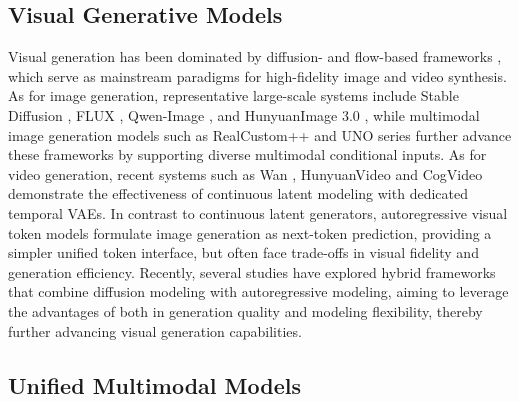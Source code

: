 \subsection{Visual Generative Models}
Visual generation has been dominated by diffusion- and flow-based frameworks \cite{ho2020denoising,esser2024scaling,lipman2024flow,wu2024vmix,huang2024realcustom, mao2024realcustom++,fu2025feededit,fu2026layeredit,mou2025dreamo,blackforestlabs_flux,labs2025flux}, which serve as mainstream paradigms for high-fidelity image and video synthesis.
As for image generation, representative large-scale systems include Stable Diffusion \cite{rombach2022high,podell2024sdxl,wu2024taiyidiffusionxl,esser2024scaling}, FLUX \cite{blackforestlabs_flux,labs2025flux}, Qwen-Image \cite{wu2025qwen}, and HunyuanImage 3.0 \cite{cao2025hunyuanimage}, while multimodal image generation models such as RealCustom++ \cite{huang2024realcustom, mao2025realcustom++} and UNO series \cite{wu2025less,cheng2025umo,wu2025uso} further advance these frameworks by supporting diverse multimodal conditional inputs. As for video generation, recent systems such as Wan \cite{wan2025wan}, HunyuanVideo \cite{wu2025hunyuanvideo} and CogVideo \cite{hong2022cogvideo,yang2024cogvideox} demonstrate the effectiveness of continuous latent modeling with dedicated temporal VAEs.
In contrast to continuous latent generators, autoregressive visual token models \cite{ramesh2021zero,chang2022maskgit,esser2021taming,peebles2023scalable,kondratyuk2023videopoet,tian2024visual,huang2023towards,mao2026toward} formulate image generation as next-token prediction, providing a simpler unified token interface, but often face trade-offs in visual fidelity and generation efficiency.
Recently, several studies \cite{liu2024mardini,li2024autoregressive,fan2025unified} have explored hybrid frameworks that combine diffusion modeling with autoregressive modeling, aiming to leverage the advantages of both in generation quality and modeling flexibility, thereby further advancing visual generation capabilities.

\subsection{Unified Multimodal Models}

